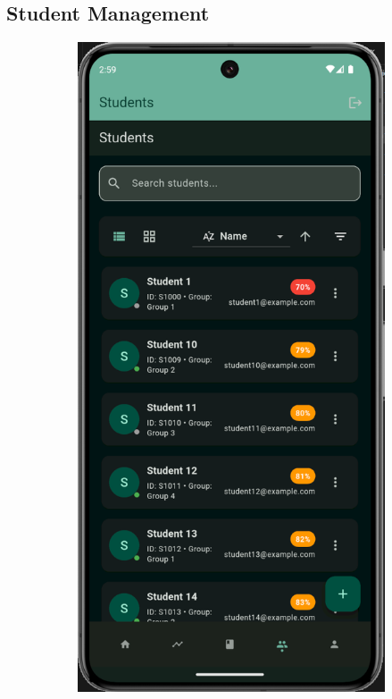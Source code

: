 \subsection{Student Management}\nopagebreak[4]
\vspace{0.5cm}
\begin{figure}[H]
    \centering
    \begin{subfigure}[b]{0.35\textwidth}
        \includegraphics[width=\textwidth]{images/rachid/teacher-side-studentpage.png}

\end{subfigure}
\end{figure}
